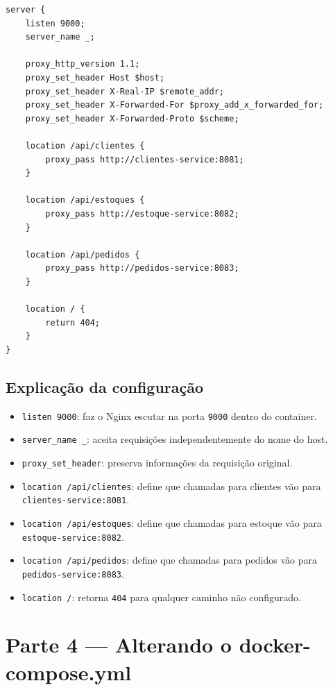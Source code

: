 \documentclass[12pt,a4paper]{article}
\begin{document}
\begin{lstlisting}[style=code]
server {
    listen 9000;
    server_name _;

    proxy_http_version 1.1;
    proxy_set_header Host $host;
    proxy_set_header X-Real-IP $remote_addr;
    proxy_set_header X-Forwarded-For $proxy_add_x_forwarded_for;
    proxy_set_header X-Forwarded-Proto $scheme;

    location /api/clientes {
        proxy_pass http://clientes-service:8081;
    }

    location /api/estoques {
        proxy_pass http://estoque-service:8082;
    }

    location /api/pedidos {
        proxy_pass http://pedidos-service:8083;
    }

    location / {
        return 404;
    }
}
\end{lstlisting}

\subsection{Explica\c{c}\~ao da configura\c{c}\~ao}

\begin{itemize}[leftmargin=1.5em]
  \item \texttt{listen 9000}: faz o Nginx escutar na porta \texttt{9000} dentro do container.
  \item \texttt{server\_name \_}: aceita requisi\c{c}\~oes independentemente do nome do host.
  \item \texttt{proxy\_set\_header}: preserva informa\c{c}\~oes da requisi\c{c}\~ao original.
  \item \texttt{location /api/clientes}: define que chamadas para clientes v\~ao para \texttt{clientes-service:8081}.
  \item \texttt{location /api/estoques}: define que chamadas para estoque v\~ao para \texttt{estoque-service:8082}.
  \item \texttt{location /api/pedidos}: define que chamadas para pedidos v\~ao para \texttt{pedidos-service:8083}.
  \item \texttt{location /}: retorna \texttt{404} para qualquer caminho n\~ao configurado.
\end{itemize}


\section{Parte 4 --- Alterando o docker-compose.yml}
\end{document}
